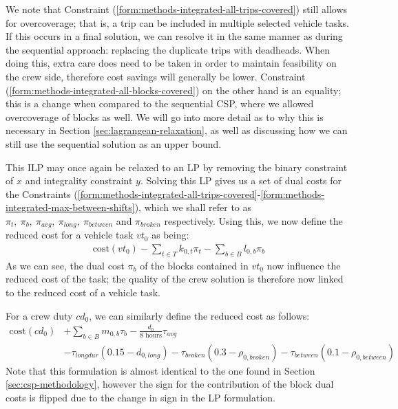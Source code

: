 \documentclass[]{article}
\begin{document}
We note that Constraint (\ref{form:methods-integrated-all-trips-covered}) still allows for overcoverage; that is, a trip can be included in multiple selected vehicle tasks. If this occurs in a final solution, we can resolve it in the same manner as during the sequential approach: replacing the duplicate trips with deadheads. When doing this, extra care does need to be taken in order to maintain feasibility on the crew side, therefore cost savings will generally be lower. Constraint (\ref{form:methods-integrated-all-blocks-covered}) on the other hand is an equality; this is a change when compared to the sequential CSP, where we allowed overcoverage of blocks as well. We will go into more detail as to why this is necessary in Section \ref{sec:lagrangean-relaxation}, as well as discussing how we can still use the sequential solution as an upper bound. 

This ILP may once again be relaxed to an LP by removing the binary constraint of $x$ and integrality constraint $y$. Solving this LP gives us a set of dual costs for the Constraints (\ref{form:methods-integrated-all-trips-covered}-\ref{form:methods-integrated-max-between-shifts}), which we shall refer to as $\pi_t,\:\pi_b,\:\pi_{avg},\:\pi_{long},\:\pi_{between}$ and $\pi_{broken}$ respectively. Using this, we now define the reduced cost for a vehicle task $vt_0$ as being:
\begin{align}
\text{cost}(vt_0) - \sum_{t \in T} k_{0,t}\pi_t - \sum_{b \in B} l_{0,b}\pi_b \label{form:evcsp-rc-vt}
\end{align}
As we can see, the dual cost $\pi_b$ of the blocks contained in $vt_0$ now influence the reduced cost of the task; the quality of the crew solution is therefore now linked to the reduced cost of a vehicle task.

For a crew duty $cd_0$, we can similarly define the reduced cost as follows: 
\begin{align}
\text{cost}(cd_0) 
&+ \sum_{b \in B} m_{0,b} \tau_{b} 
- \frac{d_0}{\text{8 hours}} \tau_{\textit{avg}} \nonumber \\
&- \tau_{\textit{longdur}} (0.15 - d_{0,\textit{long}}) 
- \tau_{\textit{broken}} (0.3 - \rho_{0,\textit{broken}}) 
- \tau_{\textit{between}} (0.1 - \rho_{0,\textit{between}})
\end{align}
Note that this formulation is almost identical to the one found in Section \ref{sec:csp-methodology}, however the sign for the contribution of the block dual costs is flipped due to the change in sign in the LP formulation. 
\end{document}
